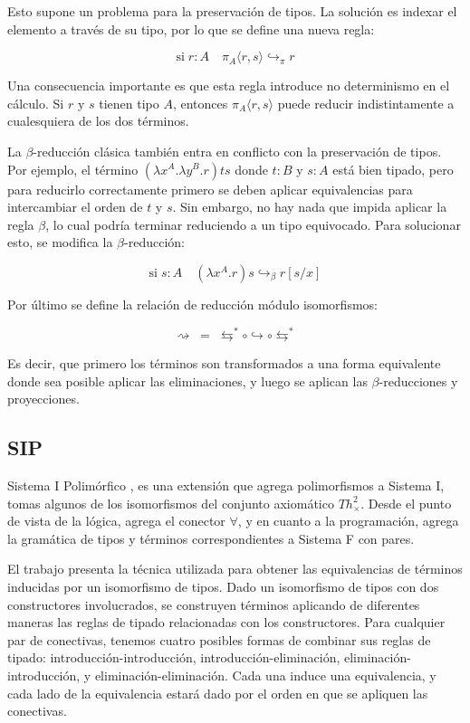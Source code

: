 \documentclass[]{report}
\begin{document}
	Esto supone un problema para la preservación de tipos.
	La solución es indexar el elemento a través de su tipo, por lo que se define una nueva regla:
	
	\[ \text{si} \; r:A \quad \pi_A \langle r, s \rangle \hookrightarrow_{\pi} r \]
	
	Una consecuencia importante es que esta regla introduce no determinismo en el cálculo.
	Si $r$ y $s$ tienen tipo $A$, entonces $\pi_A \langle r, s \rangle$ puede reducir indistintamente a cualesquiera de los dos términos.
	
	
	La $\beta$-reducción clásica también entra en conflicto con la preservación de tipos.
	Por ejemplo, el término $(\lambda x^A . \lambda y^B . r)ts$ donde $t:B$ y $s:A$ está bien tipado, pero para reducirlo correctamente primero se deben aplicar equivalencias para intercambiar el orden de $t$ y $s$.
	Sin embargo, no hay nada que impida aplicar la regla $\beta$, lo cual podría terminar reduciendo a un tipo equivocado.
	Para solucionar esto, se modifica la $\beta$-reducción:
	
	\[ \text{si} \; s:A \quad (\lambda x^A.r) s \hookrightarrow_{\beta} r[s/x] \]
	
	Por último se define la relación de reducción módulo isomorfismos:
	
	\[ \rightsquigarrow \; = \; \leftrightarrows^* \circ \hookrightarrow \circ \leftrightarrows^* \]
	
	Es decir, que primero los términos son transformados a una forma equivalente donde sea posible aplicar las eliminaciones, y luego se aplican las $\beta$-reducciones y proyecciones.
	
	
	\subsection{SIP}
	Sistema I Polimórfico \cite{sip}, es una extensión que agrega polimorfismos a Sistema I, tomas algunos de los isomorfismos del conjunto axiomático $Th^2_\times$.
	Desde el punto de vista de la lógica, agrega el conector $\forall$, y en cuanto a la programación, agrega la gramática
	de tipos y términos correspondientes a Sistema F con pares.
	
	El trabajo presenta la técnica utilizada para obtener las equivalencias de términos inducidas por un isomorfismo de tipos.
	Dado un isomorfismo de tipos con dos constructores involucrados, se construyen términos aplicando de diferentes maneras las reglas de tipado relacionadas con los constructores.
	Para cualquier par de conectivas, tenemos cuatro posibles formas de combinar sus reglas de tipado: introducción-introducción, introducción-eliminación, eliminación-introducción, y eliminación-eliminación.
	Cada una induce una equivalencia, y cada lado de la equivalencia estará dado por el orden en que se apliquen las conectivas.
	
\end{document}
